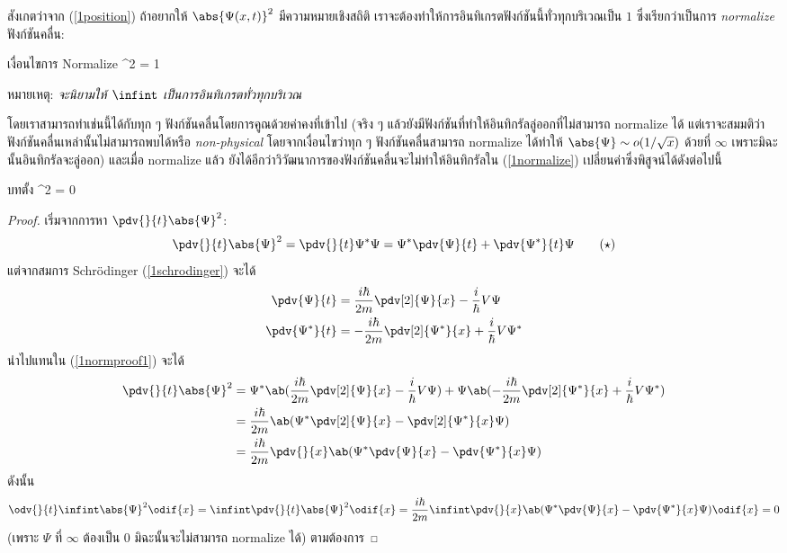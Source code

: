 สังเกตว่าจาก (\ref{1position}) ถ้าอยากให้ $\abs{\Psi(x, t)}^2$ มีความหมายเชิงสถิติ เราจะต้องทำให้การอินทิเกรตฟังก์ชันนี้ทั่วทุกบริเวณเป็น $1$ ซึ่งเรียกว่าเป็นการ \emph{normalize} ฟังก์ชันคลื่น:
\begin{eqbox}{เงื่อนไขการ Normalize}
    \infint{}^2  = 1 \label{1normalize}
\end{eqbox}
หมายเหตุ: \emph{จะนิยามให้ $\infint$ เป็นการอินทิเกรตทั่วทุกบริเวณ}

โดยเราสามารถทำเช่นนี้ได้กับทุก ๆ ฟังก์ชันคลื่นโดยการคูณด้วยค่าคงที่เข้าไป (จริง ๆ แล้วยังมีฟังก์ชันที่ทำให้อินทิกรัลลู่ออกที่ไม่สามารถ normalize ได้ แต่เราจะสมมติว่าฟังก์ชันคลื่นเหล่านั้นไม่สามารถพบได้หรือ \emph{non-physical} โดยจากเงื่อนไขว่าทุก ๆ ฟังก์ชันคลื่นสามารถ normalize ได้ทำให้ $\abs{\Psi} \sim o(1/\sqrt{x})$ ด้วยที่ $\infty$ เพราะมิฉะนั้นอินทิกรัลจะลู่ออก) และเมื่อ normalize แล้ว ยังได้อีกว่าวิวัฒนาการของฟังก์ชันคลื่นจะไม่ทำให้อินทิกรัลใน (\ref{1normalize}) เปลี่ยนค่าซึ่งพิสูจน์ได้ดังต่อไปนี้
\begin{eqbox}{บทตั้ง}
     \infint {}^2  = 0
\end{eqbox}
\begin{proof}
    เริ่มจากการหา $\pdv{}{t}\abs{\Psi}^2$:
    \begin{equation}
        \pdv{}{t}\abs{\Psi}^2 = \pdv{}{t}\Psi^*\Psi = \Psi^*\pdv{\Psi}{t} + \pdv{\Psi^*}{t}\Psi \tag{$\star$}\label{1normproof1}
    \end{equation} 
    แต่จากสมการ Schrödinger (\ref{1schrodinger}) จะได้
    \begin{align*}
        \pdv{\Psi}{t} &= \frac{i\hbar}{2m}\pdv[2]{\Psi}{x} - \frac{i}{\hbar}V\Psi\\
        \pdv{\Psi^*}{t} &= -\frac{i\hbar}{2m}\pdv[2]{\Psi^*}{x} + \frac{i}{\hbar}V\Psi^*
    \end{align*}
    นำไปแทนใน (\ref{1normproof1}) จะได้
    \begin{align}
        \pdv{}{t}\abs{\Psi}^2 &= \Psi^*\ab(\frac{i\hbar}{2m}\pdv[2]{\Psi}{x} - \frac{i}{\hbar}V\Psi) + \Psi\ab(-\frac{i\hbar}{2m}\pdv[2]{\Psi^*}{x} + \frac{i}{\hbar}V\Psi^*) \notag\\
        &= \frac{i\hbar}{2m}\ab(\Psi^*\pdv[2]{\Psi}{x} - \pdv[2]{\Psi^*}{x}\Psi)\notag\\
        &= \frac{i\hbar}{2m}\pdv{}{x}\ab(\Psi^*\pdv{\Psi}{x} - \pdv{\Psi^*}{x}\Psi)\label{1normproof2}
    \end{align}
    ดังนั้น
    \[
    \odv{}{t}\infint\abs{\Psi}^2\odif{x} = \infint\pdv{}{t}\abs{\Psi}^2\odif{x} = \frac{i\hbar}{2m}\infint \pdv{}{x}\ab(\Psi^*\pdv{\Psi}{x} - \pdv{\Psi^*}{x}\Psi)\odif{x} = 0
    \]
    (เพราะ $\Psi$ ที่ $\infty$ ต้องเป็น $0$ มิฉะนั้นจะไม่สามารถ normalize ได้) ตามต้องการ
\end{proof}

